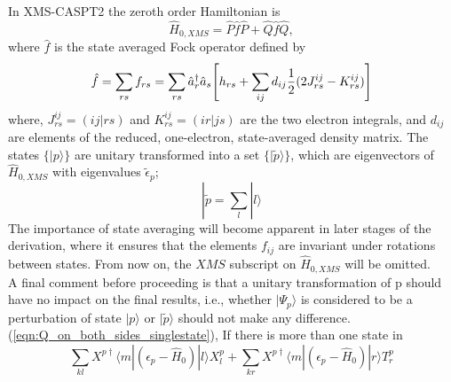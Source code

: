 \documentclass[12pt]{article}
\begin{document}
\noindent In XMS-CASPT2 the zeroth order Hamiltonian is
\begin{equation}
\hat{H}_{0,XMS} = \hat{P}\hat{f}\hat{P} +  \hat{Q}\hat{f}\hat{Q},
\end{equation}
where $\hat{f}$ is the state averaged Fock operator defined by
\begin{equation}
\hat{f} = \sum_{rs}f_{rs} = \sum_{rs}
\hat{a}^{\dagger}_{r}\hat{a}_{s}
\Bigg{[} h_{rs} 
+ \sum_{ij}d_{ij}
\frac{1}{2}( 2J^{ij}_{rs}-K^{ij}_{rs})  \Bigg{]}
\end{equation}
where, $J^{ij}_{rs} = (ij|rs)$ and $K^{ij}_{rs} = (ir|js)$ are the two electron integrals, and $d_{ij}$ are elements of the reduced, one-electron,
state-averaged density matrix. The states $\{|p\rangle\}$ are unitary transformed into a set $\{|\tilde{p}\rangle\}$, 
which are eigenvectors of $\hat{H}_{0,XMS}$ with eigenvalues $\tilde{\epsilon}_{p}$;
\begin{equation}
|\tilde{p} = \sum_{l}|l\rangle
\end{equation}
The importance of state averaging will become apparent in later stages of the derivation, 
where it ensures that the elements $f_{ij}$ are invariant under rotations
between states. From now on, the $XMS$ subscript on $\hat{H}_{0,XMS}$ will be omitted.\\ 

\noindent  A final comment before proceeding is that a unitary transformation of
$\mathrm{p}$ should have no impact on the final results, i.e., whether $|\Psi_{p} \rangle$
is considered to be a perturbation of state $|p\rangle$ or $|\tilde{p}\rangle$ should
not make any difference. \\

(\ref{eqn:Q_on_both_sides_singlestate}),
If there is more than one state in 
\begin{equation*}
  \sum_{kl}X^{p\dagger}\langle m | (\epsilon_{p} - \hat{H}_{0}) | l \rangle X_{l}^{p}
+ \sum_{kr}X^{p\dagger}\langle m | (\epsilon_{p} - \hat{H}_{0}) | r \rangle T_{r}^{p}
\end{equation*}
\end{document}
